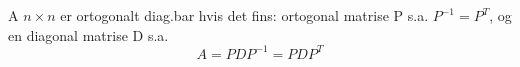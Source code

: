 A $n\times n$ er ortogonalt diag.bar hvis det fins:
ortogonal matrise P s.a. $P^{-1} = P^T$, og en diagonal matrise D s.a.
$$A = PDP^{-1} = PDP^T$$
